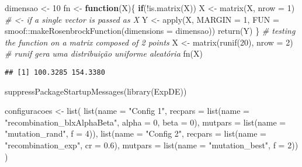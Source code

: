 \documentclass[
]{article}
\newenvironment{Shaded}{\begin{snugshade}}{\end{snugshade}}
\newcommand{\AttributeTok}[1]{\textcolor[rgb]{0.77,0.63,0.00}{#1}}
\newcommand{\CommentTok}[1]{\textcolor[rgb]{0.56,0.35,0.01}{\textit{#1}}}
\newcommand{\ControlFlowTok}[1]{\textcolor[rgb]{0.13,0.29,0.53}{\textbf{#1}}}
\newcommand{\DecValTok}[1]{\textcolor[rgb]{0.00,0.00,0.81}{#1}}
\newcommand{\FloatTok}[1]{\textcolor[rgb]{0.00,0.00,0.81}{#1}}
\newcommand{\FunctionTok}[1]{\textcolor[rgb]{0.00,0.00,0.00}{#1}}
\newcommand{\NormalTok}[1]{#1}
\newcommand{\OtherTok}[1]{\textcolor[rgb]{0.56,0.35,0.01}{#1}}
\newcommand{\SpecialCharTok}[1]{\textcolor[rgb]{0.00,0.00,0.00}{#1}}
\newcommand{\StringTok}[1]{\textcolor[rgb]{0.31,0.60,0.02}{#1}}
\begin{document}
\begin{Shaded}
\begin{Highlighting}[]
\NormalTok{dimensao }\OtherTok{\textless{}{-}} \DecValTok{10}
\NormalTok{fn }\OtherTok{\textless{}{-}} \ControlFlowTok{function}\NormalTok{(X)\{}
  \ControlFlowTok{if}\NormalTok{(}\SpecialCharTok{!}\FunctionTok{is.matrix}\NormalTok{(X)) X }\OtherTok{\textless{}{-}} \FunctionTok{matrix}\NormalTok{(X, }\AttributeTok{nrow =} \DecValTok{1}\NormalTok{) }\CommentTok{\# \textless{}{-} if a single vector is passed as X}
\NormalTok{  Y }\OtherTok{\textless{}{-}} \FunctionTok{apply}\NormalTok{(X, }\AttributeTok{MARGIN =} \DecValTok{1}\NormalTok{,}
             \AttributeTok{FUN =}\NormalTok{ smoof}\SpecialCharTok{::}\FunctionTok{makeRosenbrockFunction}\NormalTok{(}\AttributeTok{dimensions =}\NormalTok{ dimensao))}
  \FunctionTok{return}\NormalTok{(Y)}
\NormalTok{\}}
\CommentTok{\# testing the function on a matrix composed of 2 points}
\NormalTok{X }\OtherTok{\textless{}{-}} \FunctionTok{matrix}\NormalTok{(}\FunctionTok{runif}\NormalTok{(}\DecValTok{20}\NormalTok{), }\AttributeTok{nrow =} \DecValTok{2}\NormalTok{) }\CommentTok{\# runif gera uma distribuição uniforme aleatória}
\FunctionTok{fn}\NormalTok{(X)}
\end{Highlighting}
\end{Shaded}

\begin{verbatim}
## [1] 100.3285 154.3380
\end{verbatim}

\begin{Shaded}
\begin{Highlighting}[]
\FunctionTok{suppressPackageStartupMessages}\NormalTok{(}\FunctionTok{library}\NormalTok{(ExpDE))}


\NormalTok{configuracoes }\OtherTok{\textless{}{-}} \FunctionTok{list}\NormalTok{(}
  \FunctionTok{list}\NormalTok{(}\AttributeTok{name =} \StringTok{"Config 1"}\NormalTok{, }\AttributeTok{recpars =} \FunctionTok{list}\NormalTok{(}\AttributeTok{name =} \StringTok{"recombination\_blxAlphaBeta"}\NormalTok{, }\AttributeTok{alpha =} \DecValTok{0}\NormalTok{, }\AttributeTok{beta =} \DecValTok{0}\NormalTok{), }\AttributeTok{mutpars =} \FunctionTok{list}\NormalTok{(}\AttributeTok{name =} \StringTok{"mutation\_rand"}\NormalTok{, }\AttributeTok{f =} \DecValTok{4}\NormalTok{)),}
  \FunctionTok{list}\NormalTok{(}\AttributeTok{name =} \StringTok{"Config 2"}\NormalTok{, }\AttributeTok{recpars =} \FunctionTok{list}\NormalTok{(}\AttributeTok{name =} \StringTok{"recombination\_exp"}\NormalTok{, }\AttributeTok{cr =} \FloatTok{0.6}\NormalTok{), }\AttributeTok{mutpars =} \FunctionTok{list}\NormalTok{(}\AttributeTok{name =} \StringTok{"mutation\_best"}\NormalTok{, }\AttributeTok{f =} \DecValTok{2}\NormalTok{))}
\NormalTok{)}
\end{Highlighting}
\end{Shaded}
\end{document}
